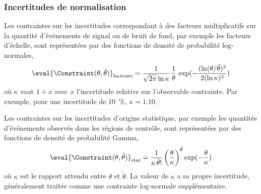 \subsubsection{Incertitudes de normalisation}
Les contraintes sur les incertitudes correspondant à des facteurs multiplicatifs sur la quantité d'événements de signal ou de bruit de fond, par exemple les facteurs d'échelle, sont représentées par des fonctions de densité de probabilité log-normales,
\begin{equation}
\eval{\Constraint(\theta, \tilde{\theta})}_{\text{facteurs}}
=
\frac{1}{\sqrt{2\pi}\ln\kappa}\,\frac{1}{\theta}\,\exp(-\frac{(\ln(\theta/\tilde{\theta})^2}{2(\ln\kappa)^2})
\end{equation}
où $\kappa$ vaut $1+x$ avec $x$ l'incertitude relative sur l'observable contrainte.
Par exemple, pour une incertitude de \SI{10}{\%}, $\kappa=\num{1.10}$.
\par
Les contraintes sur les incertitudes d'origine statistique, par exemple les quantités d'événements observés dans les régions de contrôle, sont représentées par des fonctions de densité de probabilité Gamma,
\begin{equation}
\eval{\Constraint(\theta, \tilde{\theta})}_{\text{stat}}
=
\frac{1}{\kappa \, \tilde{\theta}!} \left(\frac{\theta}{\kappa}\right)^{\tilde{\theta}} \exp(-\frac{\theta}{\kappa})
\end{equation}
où $\kappa$ est le rapport attendu entre $\theta$ et $\tilde{\theta}$.
La valeur de $\kappa$ a sa propre incertitude, généralement traitée comme une contrainte log-normale supplémentaire.
